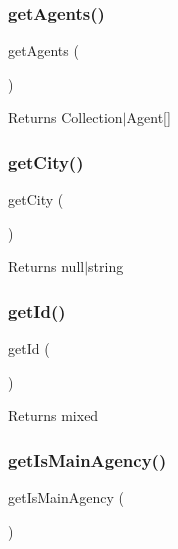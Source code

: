 \subsubsection{\texorpdfstring{getAgents()}{getAgents()}}
{\footnotesize\ttfamily get\+Agents (\begin{DoxyParamCaption}{ }\end{DoxyParamCaption})}

\begin{DoxyReturn}{Returns}
Collection$\vert$\+Agent\mbox{[}\mbox{]} 
\end{DoxyReturn}
\mbox{\label{class_app_1_1_entity_1_1_agency_ae9ca906fce6e9fe5fab3a6b42209d6a1}} 
\subsubsection{\texorpdfstring{getCity()}{getCity()}}
{\footnotesize\ttfamily get\+City (\begin{DoxyParamCaption}{ }\end{DoxyParamCaption})}

\begin{DoxyReturn}{Returns}
null$\vert$string 
\end{DoxyReturn}
\mbox{\label{class_app_1_1_entity_1_1_agency_a12251d0c022e9e21c137a105ff683f13}} 
\subsubsection{\texorpdfstring{getId()}{getId()}}
{\footnotesize\ttfamily get\+Id (\begin{DoxyParamCaption}{ }\end{DoxyParamCaption})}

\begin{DoxyReturn}{Returns}
mixed 
\end{DoxyReturn}
\mbox{\label{class_app_1_1_entity_1_1_agency_abcc8847cd0fcbcf0fd4b4dd1d3e19c8a}} 
\subsubsection{\texorpdfstring{getIsMainAgency()}{getIsMainAgency()}}
{\footnotesize\ttfamily get\+Is\+Main\+Agency (\begin{DoxyParamCaption}{ }\end{DoxyParamCaption})}

